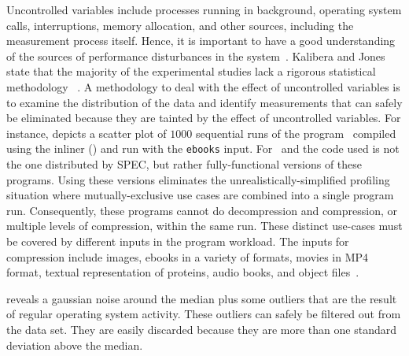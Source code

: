 Uncontrolled variables include processes running in background, operating system calls, interruptions, memory allocation, and other sources, including the measurement process itself. Hence, it is important to have a good understanding of the sources of performance disturbances in  the system~\cite{Kalibera2013}.
Kalibera and Jones state that the majority of the experimental studies lack a rigorous statistical methodology~ \cite{Kalibera2013}. A methodology to deal with the effect of uncontrolled variables is to examine the distribution of the data and identify measurements that can safely be eliminated because they are tainted by the effect of uncontrolled variables. For instance,  depicts a scatter plot of $1000$ sequential runs of the program \bzip\  compiled using the  inliner (\llvm) and run with the {\tt ebooks} input. For \bzip\ and \gzip the code used is not the one distributed by SPEC, but rather fully-functional versions of these programs. Using these versions eliminates the unrealistically-simplified profiling situation where mutually-exclusive use cases are combined into a single program run. Consequently, these programs cannot do decompression and compression, or multiple levels of compression, within the same run.  These distinct use-cases must be covered by different inputs in the program workload.
The inputs for compression include images, ebooks in a variety of formats, movies in MP4 format, textual representation of proteins, audio books, and object files~\cite{BerubePhD}.



 reveals a gaussian noise around the median plus some outliers that are the result of regular operating system activity. These outliers can safely be filtered out from the data set. They are easily discarded because they are more than one standard deviation above the median.

